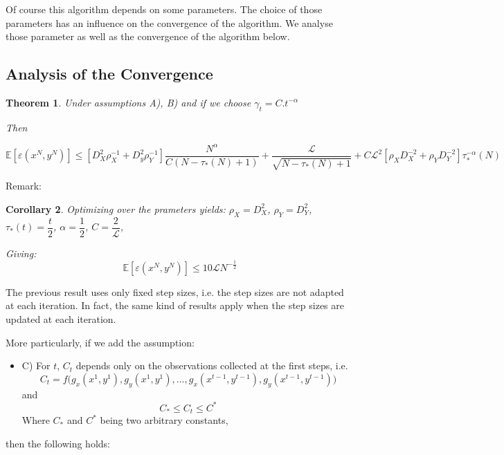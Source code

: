 \documentclass[12pt,reqno]{amsart}
\newtheorem{thm}{Theorem}[section]
\newtheorem{cor}[thm]{Corollary}
\numberwithin{equation}{section}
\begin{document}
Of course this algorithm depends on some parameters. The choice of those parameters has an influence on the convergence of the algorithm. We analyse those parameter as well as the convergence of the algorithm below.

\subsection{Analysis of the Convergence}

\begin{thm}

Under assumptions A), B) and if we choose $\gamma_{t} = C.t^{-\alpha}$

Then

$$
\mathbb{E}[\varepsilon(x^{N},y^{N})] \leq [D_{X}^{2}\rho_{X}^{-1} + D_{y}^{2}\rho_{Y}^{-1}]\dfrac{N^{\alpha}}{C(N - \tau_{*}(N) + 1)} +  \dfrac{\mathcal{L}}{\sqrt{N - \tau_{*}(N) + 1}}+ C\mathcal{L}^{2}[\rho_{X}D_{X}^{-2} + \rho_{Y}D_{Y}^{-2}]\tau_{*}^{-\alpha}(N)
$$

\end{thm}


Remark: 

\begin{cor}
Optimizing over the prameters yields:
 $\rho_{X} = D_{X}^{2}$,
$\rho_{Y} = D_{Y}^{2}$,
$\tau_{*}(t) = \dfrac{t}{2}$,
$\alpha = \dfrac{1}{2}$,
$C = \dfrac{2}{\mathcal{L}}$,

Giving:
$$
\boxed{ \mathbb{E}[\varepsilon(x^{N},y^{N})]  \leq 10\mathcal{L} N^{-\frac{1}{2}} }
$$
\end{cor}


The previous result uses only fixed step sizes, i.e. the step sizes are not adapted at each iteration.
In fact, the same kind of results apply when the step sizes are updated at each iteration.

More particularly, if we add the assumption:

\begin{itemize}
\item C) For $t$, $C_{t}$ depends only on the observations collected at the first steps, i.e. 
$$C_{t} = f\big(g_{x}(x^{1},y^{1}),g_{y}(x^{1},y^{1}),...,g_{x}(x^{t-1},y^{t-1}),g_{y}(x^{t-1},y^{t-1})\big)$$
and 
$$
C_{*} \leq C_{t} \leq C^{*}
$$
Where $C_{*}$ and $C^{*}$ being two arbitrary constants,

\end{itemize}

then the following holds:
\end{document}

